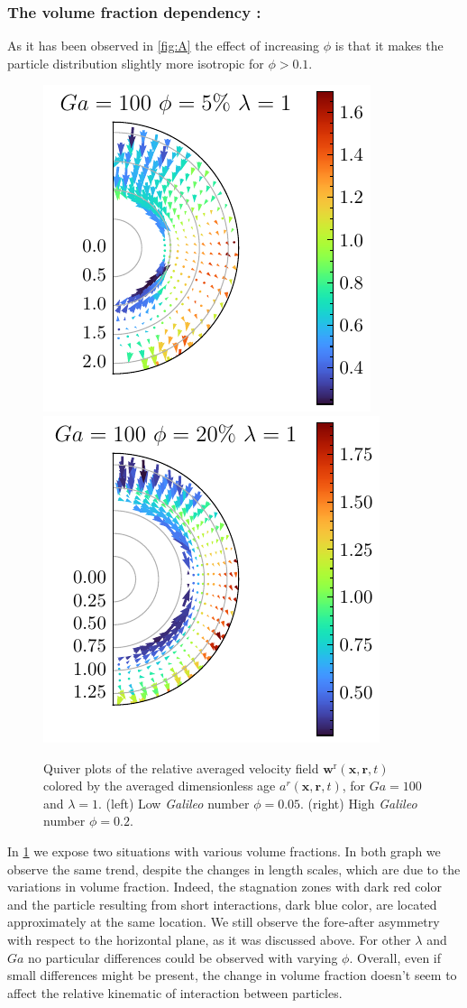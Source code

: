 \subsubsection*{The volume fraction dependency :}
As it has been observed in \ref{fig:A} the effect of increasing $\phi$ is that it makes the particle distribution slightly more isotropic for $\phi >0.1$. 
\begin{figure}[h!]
    \centering
    \includegraphics[height=0.35\textwidth]{image/HOMOGENEOUS_NEW/Dist/U_rel_l_1_Ga_100_PHI_5.pdf}
    \includegraphics[height=0.35\textwidth]{image/HOMOGENEOUS_NEW/Dist/U_rel_l_1_Ga_100_PHI_20.pdf}
    \caption{Quiver plots of the relative averaged velocity field $\textbf{w}^\text{r}(\textbf{x},\textbf{r},t)$ colored by the averaged dimensionless age $a^r(\textbf{x},\textbf{r},t)$, for $Ga = 100$ and $\lambda = 1$. 
    (left) Low \textit{Galileo} number $\phi = 0.05$.
    (right) High \textit{Galileo} number $\phi = 0.2$. }
    \label{fig:Why_Phi_matter}
\end{figure}
In \ref{fig:Why_Phi_matter} we expose two situations with various volume fractions. 
In both graph we observe the same trend, despite the changes in length scales, which are due to the variations in volume fraction. 
Indeed, the stagnation zones with dark red color and the particle resulting from short interactions, dark blue color, are located approximately at the same location. 
We still observe the fore-after asymmetry with respect to the horizontal plane, as it was discussed above. 
For other $\lambda$ and $Ga$ no particular differences could be observed with varying $\phi$. 
Overall, even if small differences might be present, the change in volume fraction doesn't seem to affect the relative kinematic of interaction between particles. 

